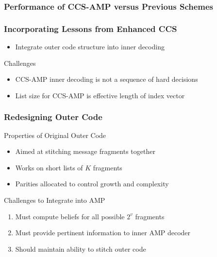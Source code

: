 
\begin{frame}
\frametitle{Performance of CCS-AMP versus Previous Schemes}
\begin{center}

\end{center}
\end{frame}


\begin{frame}
\frametitle{Incorporating Lessons from Enhanced CCS}
\begin{itemize}
\item Integrate outer code structure into inner decoding
\end{itemize}
\begin{center}

\end{center}
\begin{alertblock}{Challenges}
\begin{itemize}
\item CCS-AMP inner decoding is not a sequence of hard decisions
\item List size for CCS-AMP is effective length of index vector
\end{itemize}
\end{alertblock}

\end{frame}


\begin{frame}
\frametitle{Redesigning Outer Code}
\begin{block}{Properties of Original Outer Code}
\begin{itemize}
\item Aimed at stitching message fragments together
\item Works on short lists of $K$ fragments
\item Parities allocated to control growth and complexity
\end{itemize}
\end{block}
\begin{center}

\end{center}
\begin{block}{Challenges to Integrate into AMP}
\begin{enumerate}
\item Must compute beliefs for all possible $2^v$ fragments
\item Must provide pertinent information to inner AMP decoder
\item Should maintain ability to stitch outer code
\end{enumerate}
\end{block}
\end{frame}

